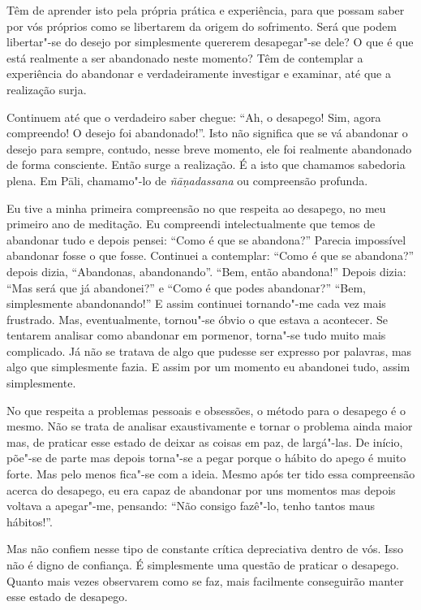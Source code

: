 Têm de aprender isto pela própria prática e experiência, para que possam saber
por vós próprios como se libertarem da origem do sofrimento. Será que podem
libertar"-se do desejo por simplesmente quererem desapegar"-se dele? O que é que
está realmente a ser abandonado neste momento? Têm de contemplar a experiência
do abandonar e verdadeiramente investigar e examinar, até que a realização
surja.

Continuem até que o verdadeiro saber chegue: “Ah, o desapego! Sim, agora
compreendo! O desejo foi abandonado!”. Isto não significa que se vá abandonar o
desejo para sempre, contudo, nesse breve momento, ele foi realmente abandonado 
de forma consciente. Então surge a realização. É a isto que
chamamos sabedoria plena. Em Pāli, chamamo"-lo de \emph{ñāṇadassana} ou
compreensão profunda.

Eu tive a minha primeira compreensão no que respeita ao desapego, no meu primeiro
ano de meditação. Eu compreendi intelectualmente que temos de abandonar tudo e
depois pensei: “Como é que se abandona?” Parecia impossível abandonar fosse o
que fosse. Continuei a contemplar: “Como é que se abandona?” depois dizia,
“Abandonas, abandonando”. “Bem, então abandona!” Depois dizia: “Mas será que já
abandonei?” e “Como é que podes abandonar?” “Bem, simplesmente abandonando!” E
assim continuei tornando"-me cada vez mais frustrado. Mas, eventualmente,
tornou"-se óbvio o que estava a acontecer. Se tentarem analisar como abandonar em
pormenor, torna"-se tudo muito mais complicado. Já não se tratava de algo que
pudesse ser expresso por palavras, mas algo que simplesmente fazia. E assim por
um momento eu abandonei tudo, assim simplesmente.

No que respeita a problemas pessoais e obsessões, o método para o desapego é o
mesmo. Não se trata de analisar exaustivamente e tornar o problema ainda maior
mas, de praticar esse estado de deixar as coisas em paz, de largá"-las. De
início, põe"-se de parte mas depois torna"-se a pegar porque o hábito do apego é
muito forte. Mas pelo menos fica"-se com a ideia. Mesmo após ter tido essa
compreensão acerca do desapego, eu era capaz de abandonar por uns momentos mas
depois voltava a apegar"-me, pensando: “Não consigo fazê"-lo, tenho tantos
maus hábitos!”.

Mas não confiem nesse tipo de constante crítica depreciativa dentro de vós. Isso não
é digno de confiança. É simplesmente uma questão de praticar o desapego. Quanto
mais vezes observarem como se faz, mais facilmente conseguirão manter esse
estado de desapego.

